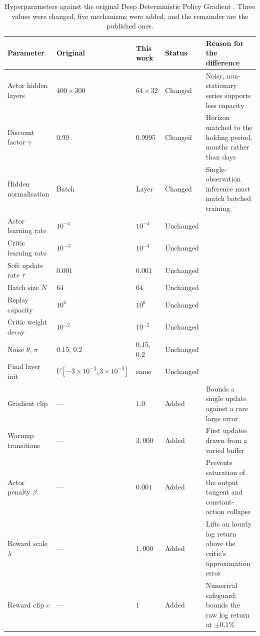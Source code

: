\begin{table}[htb!]
\centering
\footnotesize
\begin{tabularx}{\textwidth}{@{}llll X@{}}
\toprule
\textbf{Parameter} & \textbf{Original} & \textbf{This work} & \textbf{Status} & \textbf{Reason for the difference} \\
\midrule
Actor hidden layers & $400 \times 300$ & $64 \times 32$ & Changed & Noisy, non-stationary series supports less capacity \\
Discount factor $\gamma$ & $0.99$ & $0.9995$ & Changed & Horizon matched to the holding period, months rather than days \\
Hidden normalisation & Batch & Layer & Changed & Single-observation inference must match batched training \\
\addlinespace
Actor learning rate & $10^{-4}$ & $10^{-4}$ & Unchanged & \\
Critic learning rate & $10^{-3}$ & $10^{-3}$ & Unchanged & \\
Soft update rate $\tau$ & $0.001$ & $0.001$ & Unchanged & \\
Batch size $N$ & $64$ & $64$ & Unchanged & \\
Replay capacity & $10^{6}$ & $10^{6}$ & Unchanged & \\
Critic weight decay & $10^{-2}$ & $10^{-2}$ & Unchanged & \\
Noise $\theta$, $\sigma$ & $0.15$, $0.2$ & $0.15$, $0.2$ & Unchanged & \\
Final layer init & $U[-3\!\times\!10^{-3}, 3\!\times\!10^{-3}]$ & same & Unchanged & \\
\addlinespace
Gradient clip & --- & $1.0$ & Added & Bounds a single update against a rare large error \\
Warmup transitions & --- & $3{,}000$ & Added & First updates drawn from a varied buffer \\
Actor penalty $\beta$ & --- & $0.001$ & Added & Prevents saturation of the output tangent and constant-action collapse \\
Reward scale $\lambda$ & --- & $1{,}000$ & Added & Lifts an hourly log return above the critic's approximation error \\
Reward clip $c$ & --- & $1$ & Added & Numerical safeguard; bounds the raw log return at $\pm 0.1\%$ \\
\bottomrule
\end{tabularx}
\caption{Hyperparameters against the original Deep Deterministic Policy Gradient \cite{lillicrap_continuous_2015}. Three values were changed, five mechanisms were added, and the remainder are the published ones.}
\label{Tables:Hyperparameters}
\end{table}